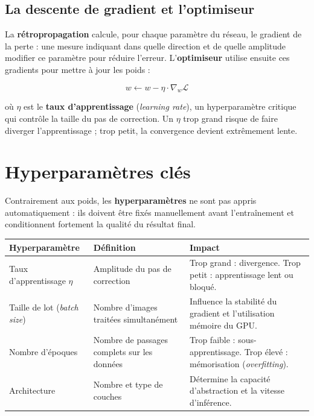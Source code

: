 \documentclass[11pt,a4paper,openany]{book}
\newcommand{\tableheadcolor}{\rowcolor{headerbg}}
\newcommand{\tablerowodd}{}
\begin{document}
\subsection{La descente de gradient et l'optimiseur}

La \textbf{rétropropagation} calcule, pour chaque paramètre du réseau, le gradient de la perte : une mesure indiquant dans quelle direction et de quelle amplitude modifier ce paramètre pour réduire l'erreur. L'\textbf{optimiseur} utilise ensuite ces gradients pour mettre à jour les poids :

\[
w \leftarrow w - \eta \cdot \nabla_w \mathcal{L}
\]

où $\eta$ est le \textbf{taux d'apprentissage} (\textit{learning rate}), un hyperparamètre critique qui contrôle la taille du pas de correction. Un $\eta$ trop grand risque de faire diverger l'apprentissage ; trop petit, la convergence devient extrêmement lente.

\section{Hyperparamètres clés}

Contrairement aux poids, les \textbf{hyperparamètres} ne sont pas appris automatiquement : ils doivent être fixés manuellement avant l'entraînement et conditionnent fortement la qualité du résultat final.

\vspace{0.8em}
\renewcommand{\arraystretch}{1.5}
\begin{tabularx}{\linewidth}{C{3.2cm} L{4.2cm} L{8cm}}
  \toprule
  \tableheadcolor
  \textbf{Hyperparamètre} & \textbf{Définition} & \textbf{Impact} \\
  \midrule
  \tablerowodd
  Taux d'apprentissage $\eta$ & Amplitude du pas de correction & Trop grand : divergence. Trop petit : apprentissage lent ou bloqué. \\
  Taille de lot (\textit{batch size}) & Nombre d'images traitées simultanément & Influence la stabilité du gradient et l'utilisation mémoire du GPU. \\
  \tablerowodd
  Nombre d'époques & Nombre de passages complets sur les données & Trop faible : sous-apprentissage. Trop élevé : mémorisation (\textit{overfitting}). \\
  Architecture & Nombre et type de couches & Détermine la capacité d'abstraction et la vitesse d'inférence. \\
  \bottomrule
\end{tabularx}
\end{document}

